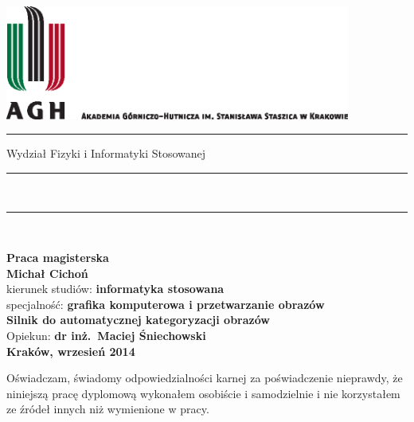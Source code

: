 \documentclass[a4paper,12pt]{book}
\begin{document}
\nocite{*}


\thispagestyle{empty}
\includegraphics[height=37.5mm]{agh_nzw_a_pl_1w_wbr_cmyk.eps}\\
\rule{30mm}{0pt}
{\large \textsf{Wydział Fizyki i Informatyki Stosowanej}}\\
\rule{\textwidth}{3pt}\\
\rule[2ex]
{\textwidth}{1pt}\\
\vspace{6ex}
\begin{center}
{\LARGE \bf \textsf{Praca magisterska}}\\
\vspace{13ex}
{\bf \Large \textsf{Michał Cichoń}}\\
\vspace{3ex}
{\sf\small kierunek studiów:} {\bf\small \textsf{informatyka stosowana}}\\
\vspace{1.5ex}
{\sf\small specjalność:} {\bf\small \textsf{grafika komputerowa i przetwarzanie obrazów}}\\
\vspace{10ex}
{\bf \huge \textsf{Silnik do automatycznej kategoryzacji obrazów}}\\
\vspace{14ex}
{\Large Opiekun: \bf \textsf{dr inż.\ Maciej Śniechowski}}\\
\vspace{22ex}
{\large \bf \textsf{Kraków, wrzesień 2014}}
\end{center}

\newpage

{\sf Oświadczam, świadomy odpowiedzialności karnej za poświadczenie nieprawdy, że niniejszą pracę dyplomową wykonałem osobiście i samodzielnie i  nie korzystałem ze źródeł innych niż wymienione w pracy.}
\end{document}
